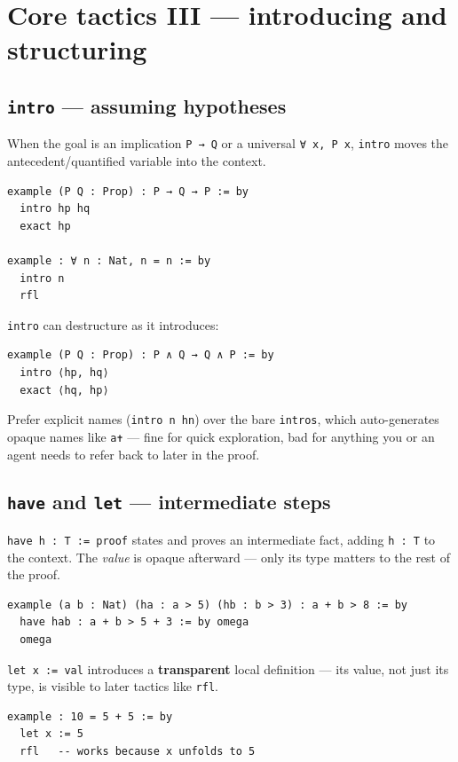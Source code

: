 \section{Core tactics III --- introducing and structuring}

\subsection{\texttt{intro} --- assuming hypotheses}

When the goal is an implication \texttt{P → Q} or a universal \texttt{∀ x, P x}, \texttt{intro} moves the antecedent/quantified variable into the context.

\begin{verbatim}
example (P Q : Prop) : P → Q → P := by
  intro hp hq
  exact hp

example : ∀ n : Nat, n = n := by
  intro n
  rfl
\end{verbatim}

\texttt{intro} can destructure as it introduces:

\begin{verbatim}
example (P Q : Prop) : P ∧ Q → Q ∧ P := by
  intro ⟨hp, hq⟩
  exact ⟨hq, hp⟩
\end{verbatim}

Prefer explicit names (\texttt{intro n hn}) over the bare \texttt{intros}, which auto-generates opaque names like \texttt{a✝} --- fine for quick exploration, bad for anything you or an agent needs to refer back to later in the proof.

\subsection{\texttt{have} and \texttt{let} --- intermediate steps}

\texttt{have h : T := proof} states and proves an intermediate fact, adding \texttt{h : T} to the context. The \emph{value} is opaque afterward --- only its type matters to the rest of the proof.

\begin{verbatim}
example (a b : Nat) (ha : a > 5) (hb : b > 3) : a + b > 8 := by
  have hab : a + b > 5 + 3 := by omega
  omega
\end{verbatim}

\texttt{let x := val} introduces a \textbf{transparent} local definition --- its value, not just its type, is visible to later tactics like \texttt{rfl}.

\begin{verbatim}
example : 10 = 5 + 5 := by
  let x := 5
  rfl   -- works because x unfolds to 5
\end{verbatim}

